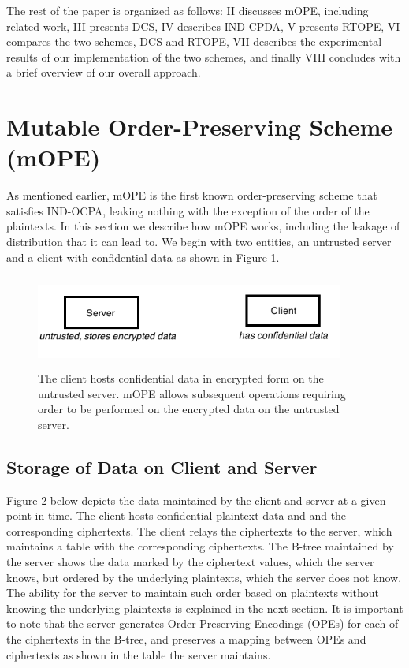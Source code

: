 \documentclass[12pt]{article}
\begin{document}
The rest of the paper is organized as follows: II discusses mOPE, including related work, III presents DCS, IV describes IND-CPDA, V presents RTOPE, VI compares the two schemes, DCS and RTOPE, VII describes the experimental results of our implementation of the two schemes, and finally VIII concludes with a brief overview of our overall approach. 

\section{Mutable Order-Preserving Scheme (mOPE)}

As mentioned earlier, mOPE is the first known order-preserving scheme that satisfies IND-OCPA, leaking nothing with the exception of the order of the plaintexts. In this section we describe how mOPE works, including the leakage of distribution that it can lead to. We begin with two entities, an untrusted server and a client with confidential data as shown in Figure 1.

\begin{figure}[htb]
\begin{center}
\includegraphics[height=1.2in,width=4in,angle=0]{857pic4.png}
\caption{The client hosts confidential data in encrypted form on the untrusted server. mOPE allows subsequent operations requiring order to be performed on the encrypted data on the untrusted server.}
\end{center}
\end{figure}

\subsection{Storage of Data on Client and Server}

Figure 2 below depicts the data maintained by the client and server at a given point in time. The client hosts confidential plaintext data and and the corresponding ciphertexts. The client relays the ciphertexts to the server, which maintains a table with the corresponding ciphertexts. The B-tree maintained by the server shows the data marked by the ciphertext values, which the server knows, but ordered by the underlying plaintexts, which the server does not know. The ability for the server to maintain such order based on plaintexts without knowing the underlying plaintexts is explained in the next section. It is important to note that the server generates Order-Preserving Encodings (OPEs) for each of the ciphertexts in the B-tree, and preserves a mapping between OPEs and ciphertexts as shown in the table the server maintains.
\end{document}

